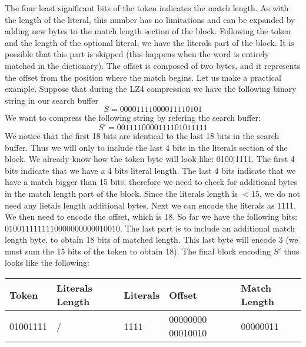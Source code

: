 The four least significant bits of the token indicates the match length. As with the
length of the literal, this number has no limitations and can be expanded by adding new
bytes to the match length section of the block.
Following the token and the length of the optional literal, we have the literals part of
the block. It is possible that this part is skipped (this happens when the word is
entirely matched in the dictionary).
The offset is composed of two bytes, and it represents the offset from the position where
the match begins.
Let us make a practical example. Suppose that during the LZ4 compression we have the following
binary string in our search buffer
$$S = 00001111000011110101$$
We want to compress the following string by refering the search buffer:
$$S' = 0011110000111101011111$$
We notice that the first 18 bits are identical to the last 18 bits in the search buffer. Thus
we will only to include the last 4 bits in the literals section of the block.
We already know how the token byte will look like: 0100|1111. The first 4 bits indicate that
we have a 4 bits literal length. The last 4 bits indicate that we have a match bigger than
15 bits, therefore we need to check for additional bytes in the match length part of the block.
Since the literals length is $< 15$, we do not need any lietals length additional bytes.
Next we can encode the literals as 1111. We then need to encode the offset, which is 18.
So far we have the following bits: $01001111 1111 00000000 00010010$.
The last part is to include an additional match length byte, to obtain 18 bits of matched
length. This last byte will encode 3 (we must sum the 15 bits of the token to obtain 18).
The final block encoding $S'$ thus looks like the following:
\begin{table}[!htbp]
\centering
\begin{tabular}{l|l|l|l|l}
\textbf{Token} & \textbf{Literals Length} & \textbf{Literals} & \textbf{Offset} & \textbf{Match Length} \\ 
\hline
01001111 & / & 1111 & 00000000 00010010 & 00000011 \\
\end{tabular}
\end{table}

